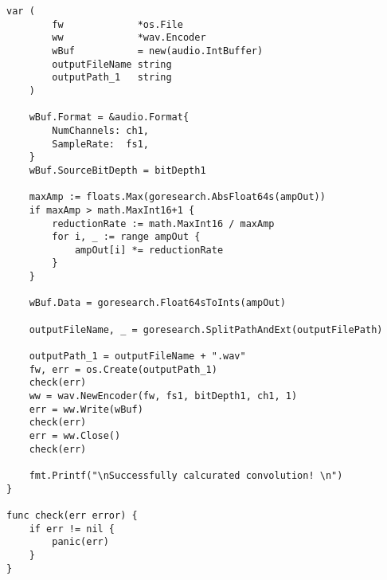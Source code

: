 \begin{lstlisting}[caption=cmd/convolve\_wav/main.go,label=convolve_wav]
	var (
		fw             *os.File
		ww             *wav.Encoder
		wBuf           = new(audio.IntBuffer)
		outputFileName string
		outputPath_1   string
	)

	wBuf.Format = &audio.Format{
		NumChannels: ch1,
		SampleRate:  fs1,
	}
	wBuf.SourceBitDepth = bitDepth1

	maxAmp := floats.Max(goresearch.AbsFloat64s(ampOut))
	if maxAmp > math.MaxInt16+1 {
		reductionRate := math.MaxInt16 / maxAmp
		for i, _ := range ampOut {
			ampOut[i] *= reductionRate
		}
	}

	wBuf.Data = goresearch.Float64sToInts(ampOut)

	outputFileName, _ = goresearch.SplitPathAndExt(outputFilePath)

	outputPath_1 = outputFileName + ".wav"
	fw, err = os.Create(outputPath_1)
	check(err)
	ww = wav.NewEncoder(fw, fs1, bitDepth1, ch1, 1)
	err = ww.Write(wBuf)
	check(err)
	err = ww.Close()
	check(err)

	fmt.Printf("\nSuccessfully calcurated convolution! \n")
}

func check(err error) {
	if err != nil {
		panic(err)
	}
}
\end{lstlisting}

